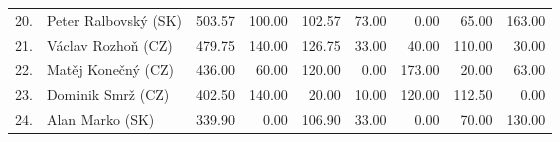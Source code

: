 \begin{tabular}{rl|r|rrrrrr}
20. & Peter Ralbovský (SK) & 503.57 & 100.00 & 102.57 & 73.00 & 0.00 & 65.00 & 163.00 \\
21. & Václav Rozhoň (CZ) & 479.75 & 140.00 & 126.75 & 33.00 & 40.00 & 110.00 & 30.00 \\
22. & Matěj Konečný (CZ) & 436.00 & 60.00 & 120.00 & 0.00 & 173.00 & 20.00 & 63.00 \\
23. & Dominik Smrž (CZ) & 402.50 & 140.00 & 20.00 & 10.00 & 120.00 & 112.50 & 0.00 \\
24. & Alan Marko (SK) & 339.90 & 0.00 & 106.90 & 33.00 & 0.00 & 70.00 & 130.00 \\
\end{tabular}

